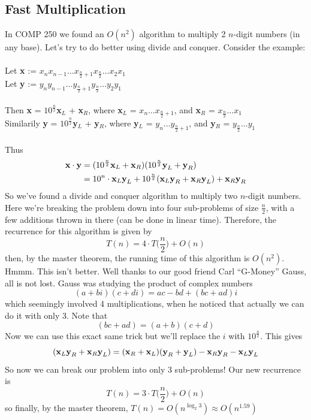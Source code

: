 \documentclass{article}
\newcommand{\tb}[1]{\textbf{#1}}
\newcommand{\x}{\cdot}
\newcommand{\ds}{\displaystyle}
\begin{document}
\subsection{Fast Multiplication}
In COMP 250 we found an $O(n^2)$ algorithm to multiply 2 $n$-digit numbers (in any base). Let's try to do better using divide and conquer. Consider the example:\\\\
Let \tb{x} := $x_nx_{n-1}\dots x_{\frac{n}{2}+1}x_{\frac{n}{2}}\dots x_2x_1$\\
Let \tb{y} := $y_ny_{n-1}\dots y_{\frac{n}{2}+1}y_{\frac{n}{2}}\dots y_2y_1$\\\\
Then \tb{x} = $10^{\frac{n}{2}}$\tb{x$_{L}$} + \tb{x$_R$}, where \tb{x$_L$} = $x_n\dots x_{\frac{n}{2}+1}$, and \tb{x$_R$} = $x_{\frac{n}{2}}\dots x_1$\\
Similarily \tb{y} = $10^{\frac{n}{2}}$\tb{y$_{L}$} + \tb{y$_R$}, where \tb{y$_L$} = $y_n\dots y_{\frac{n}{2}+1}$, and \tb{y$_R$} = $y_{\frac{n}{2}}\dots y_1$\\\\
Thus
\begin{align*}
	\text{\tb{x}}\x \text{\tb{y}} &= (10^{\frac{n}{2}}\text{\tb{x}}_L + \text{\tb{x}}_R)(10^{\frac{n}{2}}\text{\tb{y}}_L + \text{\tb{y}}_R)\\
		&= 10^n\x \text{\tb{x}}_L \text{\tb{y}}_L + 10^{\frac{n}{2}}(\text{\tb{x}}_L\text{\tb{y}}_R + \text{\tb{x}}_R\text{\tb{y}}_L) + \text{\tb{x}}_R\text{\tb{y}}_R
\end{align*}
So we've found a divide and conquer algorithm to multiply two $n$-digit numbers. Here we're breaking the problem down into four sub-problems of size $\ds \frac{n}{2}$, with a few additions thrown in there (can be done in linear time). Therefore, the recurrence for this algorithm is given by
\[T(n) = 4\x T\Big(\frac{n}{2}\Big) + O(n)\]
then, by the master theorem, the running time of this algorithm is $O(n^2)$. Hmmm. This isn't better. Well thanks to our good friend Carl ``G-Money'' Gauss, all is not lost. Gauss was studying the product of complex numbers
\[(a + bi)(c + di) = ac - bd + (bc+ad)i\]
which seemingly involved 4 multiplications, when he noticed that actually we can do it with only 3. Note that
\[(bc+ad) = (a+b)(c+d)\]
Now we can use this exact same trick but we'll replace the $i$ with $10^{\frac{n}{2}}$. This gives
\[(\text{\tb{x}}_L\text{\tb{y}}_R + \text{\tb{x}}_R\text{\tb{y}}_L) = (\text{\tb{x}}_R + \text{\tb{x}}_L)(\text{\tb{y}}_R + \text{\tb{y}}_L) - \tb{x}_R\tb{y}_R - \tb{x}_L\tb{y}_L\]
So now we can break our problem into only 3 sub-problems! Our new recurrence is
\[T(n) = 3\x T\Big(\frac{n}{2}\Big) + O(n)\]
so finally, by the master theorem, $T(n) = O(n^{\log_2 3}) \approx O(n^{1.59})$
\end{document}
